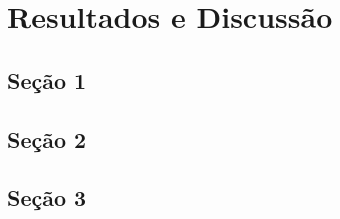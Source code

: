 \chapter{Resultados e Discussão}
\label{chap:resultados}

\section{Seção 1}



\section{Seção 2}



\section{Seção 3}